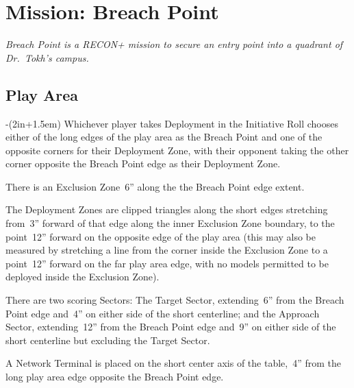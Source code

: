 \chapter{Mission: Breach Point}

\emph{\emph{Breach Point} is a RECON+ mission to secure an entry point
  into a quadrant of Dr.~Tokh's campus.}

\section{Play Area}
\vspace{-2\parskip}
\noindent\begin{stdminipage}{\linewidth-(2in+1.5em)}
\vspace{0pt}   
\noindent
Whichever player takes Deployment in the Initiative Roll chooses
either of the long edges of the play area as the Breach Point and one
of the opposite corners for their Deployment Zone, with their opponent
taking the other corner opposite the Breach Point edge as their
Deployment Zone.

There is an Exclusion Zone~6'' along the the Breach Point edge extent.

The Deployment Zones are clipped triangles along the short edges
stretching from~3'' forward of that edge along the inner Exclusion
Zone boundary, to the point~12'' forward on the opposite edge of the
play area (this may also be measured by stretching a line from the
corner inside the Exclusion Zone to a point~12'' forward on the far
play area edge, with no models permitted to be deployed inside the
Exclusion Zone).

There are two scoring Sectors: The Target Sector, extending~6'' from
the Breach Point edge and~4'' on either side of the short centerline;
and the Approach Sector, extending~12'' from the Breach Point edge
and~9'' on either side of the short centerline but excluding the
Target Sector.

A Network Terminal is placed on the short center axis of the
table,~4'' from the long play area edge opposite the Breach Point
edge.
\end{stdminipage}
\hfill
